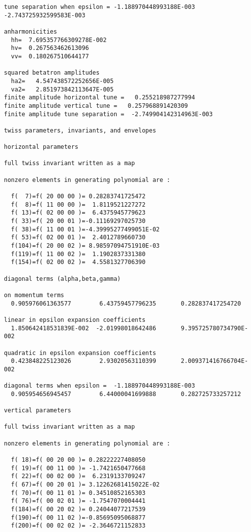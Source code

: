 \begin{footnotesize}
\begin{verbatim}
tune separation when epsilon = -1.188970448993188E-003
-2.743725932599583E-003

anharmonicities
  hh=  7.695357766309278E-002
  hv=  0.267563462613096
  vv=  0.180267510644177

squared betatron amplitudes
  ha2=   4.547438572252656E-005
  va2=   2.851973842113647E-005
finite amplitude horizontal tune =   0.255218987277994
finite amplitude vertical tune =   0.257968891420309
finite amplitude tune separation =  -2.749904142314963E-003

twiss parameters, invariants, and envelopes

horizontal parameters

full twiss invariant written as a map

nonzero elements in generating polynomial are :

  f(  7)=f( 20 00 00 )= 0.28283741725472
  f(  8)=f( 11 00 00 )=  1.8119521227272
  f( 13)=f( 02 00 00 )=  6.4375945779623
  f( 33)=f( 20 00 01 )=-0.11169297025730
  f( 38)=f( 11 00 01 )=-4.39995277499051E-02
  f( 53)=f( 02 00 01 )=  2.4012789660730
  f(104)=f( 20 00 02 )= 8.98597094751910E-03
  f(119)=f( 11 00 02 )=  1.1902837331380
  f(154)=f( 02 00 02 )=  4.5581327706390

diagonal terms (alpha,beta,gamma)

on momentum terms
  0.905976061363577        6.43759457796235       0.282837417254720

linear in epsilon expansion coefficients
  1.850642418531839E-002  -2.01998018642486       9.395725780734790E-002

quadratic in epsilon expansion coefficients
  0.423848225123026        2.93020563110399       2.009371416766704E-002

diagonal terms when epsilon =  -1.188970448993188E-003
  0.905954656945457        6.44000041699888       0.282725733257212

vertical parameters

full twiss invariant written as a map

nonzero elements in generating polynomial are :

  f( 18)=f( 00 20 00 )= 0.28222227408050
  f( 19)=f( 00 11 00 )= -1.7421650477668
  f( 22)=f( 00 02 00 )=  6.2319133709247
  f( 67)=f( 00 20 01 )= 3.12262681415022E-02
  f( 70)=f( 00 11 01 )= 0.34510852165303
  f( 76)=f( 00 02 01 )= -1.7547070004441
  f(184)=f( 00 20 02 )= 0.24044077217539
  f(190)=f( 00 11 02 )=-0.85695095068877
  f(200)=f( 00 02 02 )= -2.3646721152833


\end{verbatim}
\end{footnotesize}
